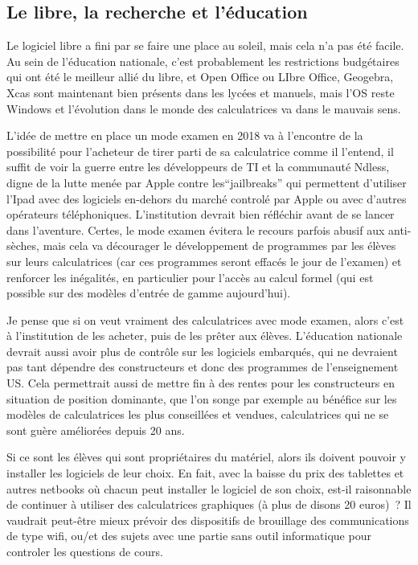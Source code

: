 \documentclass[a4paper,11pt]{article}
\begin{document}
\begin{giacjshere}
\subsection{Le libre, la recherche et l'\'education}
Le logiciel libre a fini par se faire une place au soleil,
mais cela n'a pas \'et\'e facile. Au sein de l'\'education
nationale, c'est probablement les restrictions budg\'etaires qui ont \'et\'e
le meilleur alli\'e du libre, et Open Office ou LIbre Office,
Geogebra, Xcas sont maintenant bien pr\'esents dans
les lyc\'ees et manuels, mais l'OS reste Windows et
l'\'evolution dans le monde des calculatrices va dans le mauvais sens.

L'id\'ee de mettre en place un mode examen en 2018 va \`a l'encontre
de la possibilit\'e pour l'acheteur de tirer parti de sa calculatrice
comme il l'entend, il suffit de voir la guerre entre les
d\'eveloppeurs de TI et la communaut\'e Ndless, digne
de la lutte men\'ee par Apple contre les``jailbreaks''
qui permettent d'utiliser l'Ipad avec des logiciels en-dehors
du march\'e control\'e par Apple ou avec d'autres op\'erateurs
t\'el\'ephoniques. L'institution devrait bien r\'efl\'echir avant de
se lancer dans l'aventure. Certes, le mode examen \'evitera le
recours parfois abusif aux anti-s\`eches, mais cela va d\'ecourager
le d\'eveloppement de programmes par les \'el\`eves sur leurs
calculatrices (car ces programmes seront effac\'es le jour de
l'examen) et renforcer les in\'egalit\'es, en particulier pour
l'acc\`es au calcul formel (qui est possible sur des mod\`eles
d'entr\'ee de gamme aujourd'hui).

Je pense que si on veut vraiment des calculatrices avec mode examen,
alors c'est \`a l'institution de les acheter, puis de les 
pr\^eter aux \'el\`eves. L'\'education nationale devrait aussi
avoir plus de contr\^ole sur les logiciels
embarqu\'es, qui ne devraient pas tant
d\'ependre des constructeurs
et donc des programmes de l'enseignement US. Cela permettrait
aussi de mettre fin \`a des rentes pour les constructeurs
en situation de position dominante, que l'on songe par
exemple au b\'en\'efice sur les mod\`eles de calculatrices les plus
conseill\'ees et vendues, calculatrices qui ne se sont
gu\`ere am\'elior\'ees depuis 20 ans.

Si ce sont les \'el\`eves qui sont propri\'etaires du mat\'eriel, alors
ils doivent pouvoir y installer les logiciels de leur choix.
En fait, avec la baisse du prix des tablettes et autres
netbooks o\`u chacun peut installer le logiciel de son
choix, est-il raisonnable de continuer \`a utiliser
des calculatrices graphiques (\`a plus de disons 20 euros)~? Il vaudrait
peut-\^etre mieux pr\'evoir des dispositifs de brouillage
des communications de type wifi, ou/et des sujets avec
une partie sans outil informatique pour controler les questions
de cours.


\end{giacjshere}
\end{document}
